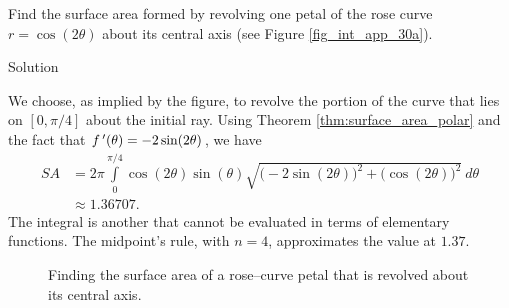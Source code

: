 \begin{example}\label{ex_polcalc8}
Find the surface area formed by revolving one petal of the rose curve $r=\cos(2\theta)$ about its central axis (see Figure \ref{fig_int_app_30a}).



Solution 

We choose, as implied by the figure, to revolve the portion of the curve that lies on $[0,\pi/4]$ about the initial ray. Using Theorem \ref{thm:surface_area_polar} and the fact that $f\,'(\theta) = -2\sin(2\theta)$, we have
\begin{align*}
SA &= 2\pi\int\limits_0^{\pi/4} \cos(2\theta)\sin(\theta)\sqrt{\big(-2\sin(2\theta)\big)^2+\big(\cos(2\theta)\big)^2}\ d\theta \\
&\approx 1.36707.
\end{align*}
The integral is another that cannot be evaluated in terms of elementary functions. The midpoint's rule, with $n=4$, approximates the value at $1.37$.


\begin{figure}[H]
\centering
\qquad
{}
\caption{Finding the surface area of a rose--curve petal that is revolved about its central axis.}
\end{figure}

\end{example}


